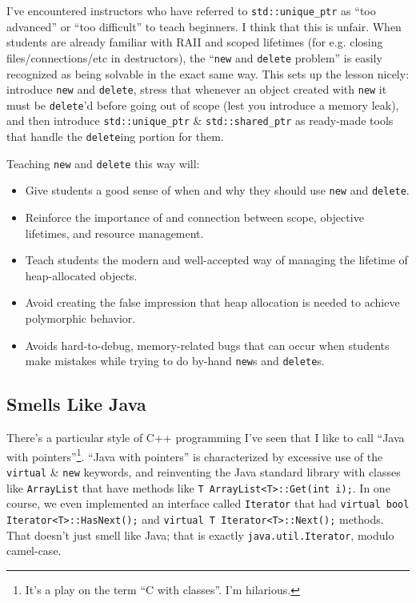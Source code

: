 \documentclass{article}
\newcommand{\CppNew}{\lstinline{new}}
\newcommand{\CppDelete}{\lstinline{delete}}
\newcommand{\NewAndDelete}{\CppNew{} and \CppDelete{}}
\begin{document}
I've encountered instructors who have referred to \lstinline{std::unique_ptr} as ``too advanced'' or ``too difficult'' to teach beginners.  I think that this is unfair.  When students are already familiar with RAII and scoped lifetimes (for e.g. closing files/connections/etc in destructors), the ``\NewAndDelete{} problem'' is easily recognized as being solvable in the exact same way.  This sets up the lesson nicely: introduce \NewAndDelete{}, stress that whenever an object created with \CppNew{} it must be \CppDelete{}'d before going out of scope (lest you introduce a memory leak), and then introduce \lstinline{std::unique_ptr} \& \lstinline{std::shared_ptr} as ready-made tools that handle the \CppDelete{}ing portion for them. 

Teaching \NewAndDelete{} this way will: 
\begin{itemize}
\item Give students a good sense of when and why they should use \NewAndDelete{}.
\item Reinforce the importance of and connection between scope, objective lifetimes, and resource management.
\item Teach students the modern and well-accepted way of managing the lifetime of heap-allocated objects. 
\item Avoid creating the false impression that heap allocation is needed to achieve polymorphic behavior.
\item Avoids hard-to-debug, memory-related bugs that can occur when students make mistakes while trying to do by-hand \CppNew{}s and \CppDelete{}s.
\end{itemize}

\subsection*{Smells Like Java}
There's a particular style of C++ programming I've seen that I like to call ``Java with pointers''\footnote{It's a play on the term ``C with classes''.  I'm hilarious.}.  ``Java with pointers'' is characterized by excessive use of the \lstinline{virtual} \& \lstinline{new} keywords, and reinventing the Java standard library with classes like \lstinline{ArrayList} that have methods like \lstinline{T ArrayList<T>::Get(int i);}.  In one course, we even implemented an interface called \lstinline{Iterator} that had \lstinline{virtual bool Iterator<T>::HasNext();} and \lstinline{virtual T Iterator<T>::Next();} methods.  That doesn't just smell like Java; that is exactly \texttt{java.util.Iterator}, modulo camel-case.
\end{document}
